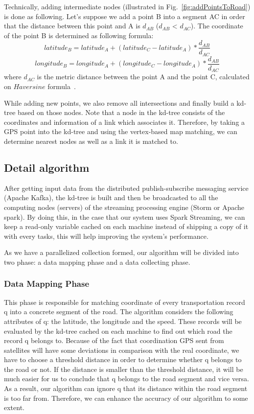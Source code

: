 \documentclass{sig-alternate-05-2015}
\begin{document}
Technically, adding intermediate nodes (illustrated in Fig.~\ref{fig:addPointsToRoad}) is done as following. Let's suppose we add a point B into a segment AC in order that the distance between this point and A is $d_{AB}$ ($d_{AB}$ < $d_{AC}$). The coordinate of the point B is determined as following formula:
\[ latitude_{B} = latitude_{A} + (latitude_{C} - latitude_{A}) \ast \frac{d_{AB}}{d_{AC}}\]
\[ longitude_{B} = longitude_{A} + (longitude_{C} - longitude_{A}) \ast \frac{d_{AB}}{d_{AC}}\]
where $d_{AC}$ is the metric distance between the point A and the point C, calculated on $Haversine$ formula~\cite{haversineweb}.

While adding new points, we also remove all intersections and finally build a kd-tree based on those nodes. Note that a node in the kd-tree consists of the coordinates and information of a link which associates it. Therefore, by taking a GPS point into the kd-tree and using the vertex-based map matching, we can determine nearest nodes as well as a link it is matched to.
	
\subsection{Detail algorithm}
		
After getting input data from the distributed publish-subscribe messaging service (Apache Kafka), the kd-tree is built and then be broadcasted to all the computing nodes (servers) of the streaming processing engine (Storm or Apache spark). By doing this, in the case that our system uses Spark Streaming, we can keep a read-only variable cached on each machine instead of shipping a copy of it with every tasks, this will help improving the system's performance.
	
As we have a parallelized collection formed, our algorithm will be divided into two phase: a data mapping phase and a data collecting phase. 

\subsubsection{Data Mapping Phase} 

This phase is responsible for matching coordinate of every transportation record q into a concrete segment of the road. The algorithm considers the following attributes of q: the latitude, the longitude and the speed. These records will be evaluated by the kd-tree cached on each machine to find out which road the record q belongs to. Because of the fact that coordination GPS sent from satellites will have some deviations in comparison with the real coordinate, we have to choose a threshold distance in order to determine whether q belongs to the road or not. If the distance is smaller than the threshold distance, it will be much easier for us to conclude that q belongs to the road segment and vice versa. As a result, our algorithm can ignore q that its distance within the road segment is too far from. Therefore, we can enhance the accuracy of our algorithm to some extent.
\end{document}
